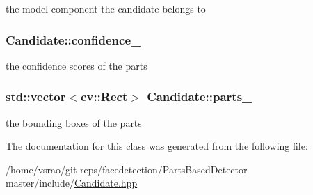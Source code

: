 the model component the candidate belongs to 

\hypertarget{classCandidate_a31785654c1d01cda9cadf93e919b30f1}{
\subsubsection[{confidence\-\_\-}]{ Candidate\-::confidence\-\_\-\hspace{0.3cm}{\ttfamily [private]}}}\label{classCandidate_a31785654c1d01cda9cadf93e919b30f1}


the confidence scores of the parts 

\hypertarget{classCandidate_aa0e3d40adf86bff2e99f3e4234ce674b}{
\subsubsection[{parts\-\_\-}]{\setlength{\rightskip}{0pt plus 5cm}std\-::vector$<$cv\-::\-Rect$>$ Candidate\-::parts\-\_\-\hspace{0.3cm}{\ttfamily [private]}}}\label{classCandidate_aa0e3d40adf86bff2e99f3e4234ce674b}


the bounding boxes of the parts 



The documentation for this class was generated from the following file\-:\begin{DoxyCompactItemize}
\item 
/home/vsrao/git-\/reps/facedetection/\-Parts\-Based\-Detector-\/master/include/\hyperlink{Candidate_8hpp}{Candidate.\-hpp}\end{DoxyCompactItemize}
